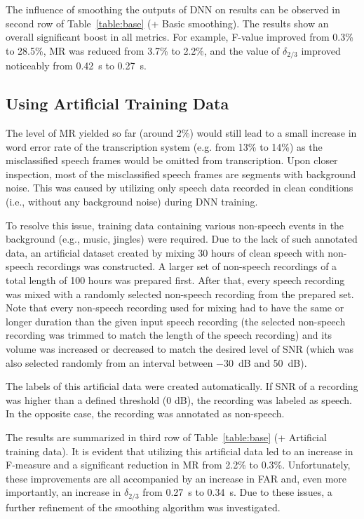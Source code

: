 \documentclass[FM,noheader,EN,bwtitles]{tulthesis}
\begin{document}
The influence of smoothing the outputs of DNN on results can be observed in second row of Table~\ref{table:base} (+ Basic smoothing).
The results show an overall significant boost in all metrics.
For example, \mbox{F-value} improved from 0.3\% to 28.5\%, MR was reduced from 3.7\% to 2.2\%, and the value of $\delta_{2/3}$ improved noticeably from 0.42~s to 0.27~s.

\subsection{Using Artificial Training Data}
\label{ss:SADartificial}

The level of MR yielded so far (around 2\%) would still lead to a small increase in word error rate of the transcription system (e.g. from 13\% to 14\%) as the misclassified speech frames would be omitted from transcription. 
Upon closer inspection, most of the misclassified speech frames are segments with background noise.
This was caused by utilizing only speech data recorded in clean conditions (i.e., without any background noise) during DNN training.

To resolve this issue, training data containing various non-speech events in the background (e.g., music, jingles) were required.
Due to the lack of such annotated data, an artificial dataset created by mixing 30 hours of clean speech with non-speech recordings was constructed.
A larger set of non-speech recordings of a total length of 100 hours was prepared first.
After that, every speech recording was mixed with a randomly selected non-speech recording from the prepared set.
Note that every non-speech recording used for mixing had to have the same or longer duration than the given input speech recording (the selected non-speech recording was trimmed to match the length of the speech recording) and its volume was increased or decreased to match the desired level of SNR (which was also selected randomly from an interval between $-30$~dB and 50~dB).

The labels of this artificial data were created automatically. 
If SNR of a recording was higher than a defined threshold (0 dB), the recording was labeled as speech.
In the opposite case, the recording was annotated as non-speech.

The results are summarized in third row of Table~\ref{table:base} (+ Artificial training data).
It is evident that utilizing this artificial data led to an increase in F-measure and a significant reduction in MR from 2.2\% to 0.3\%.
Unfortunately, these improvements are all accompanied by an increase in FAR and, even more importantly, an increase in $\delta_{2/3}$ from 0.27~s to 0.34~s.
Due to these issues, a further refinement of the smoothing algorithm was investigated.
\end{document}
